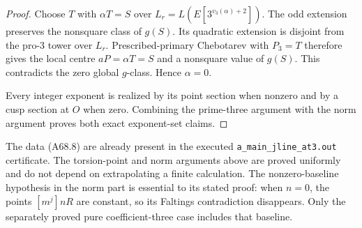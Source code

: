 \begin{proof}
Choose $T$ with $\alpha T=S$
over $L_r=L(E[3^{v_3(\alpha)+2}])$.
The odd extension preserves
the nonsquare class of
$g(S)$. Its quadratic
extension is disjoint from
the pro-$3$ tower over
$L_r$. Prescribed-primary
Chebotarev with $P_3=T$
therefore gives the local
centre $aP=\alpha T=S$
and a nonsquare value of
$g(S)$. This contradicts
the zero global $g$-class.
Hence $\alpha=0$.

Every integer exponent is
realized by its point
section when nonzero and
by a cusp section at $O$
when zero. Combining the
prime-three argument with
the norm argument proves
both exact exponent-set
claims.
\end{proof}

The data (A68.8) are already
present in the executed
\texttt{a\_main\_jline\_at3.out}
certificate. The torsion-point
and norm arguments above are
proved uniformly and do not
depend on extrapolating a
finite calculation. The
nonzero-baseline hypothesis
in the norm part is essential
to its stated proof: when
$n=0$, the points $[m^j]nR$
are constant, so its Faltings
contradiction disappears.
Only the separately proved
pure coefficient-three
case includes that baseline.
